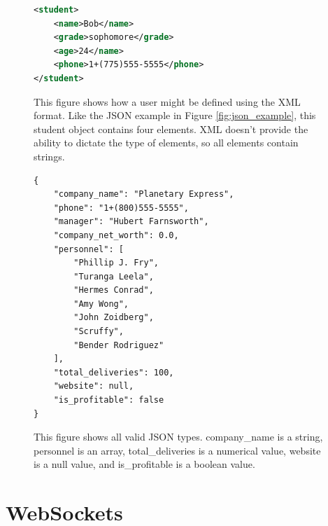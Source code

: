\begin{figure}
\begin{center}
\begin{lstlisting}[language=XML]
<student>
    <name>Bob</name>
    <grade>sophomore</grade>
    <age>24</name>
    <phone>1+(775)555-5555</phone>
</student>
\end{lstlisting}
\caption[XML Example]{This figure shows how a user might be defined using the XML format. Like the JSON example in Figure \ref{fig:json_example}, this student object contains four elements. XML doesn't provide the ability to dictate the type of elements, so all elements contain strings.\label{fig:xml_example}}
\end{center}
\end{figure}

\begin{figure}
\begin{center}
\begin{lstlisting}
{
    "company_name": "Planetary Express",
    "phone": "1+(800)555-5555",
    "manager": "Hubert Farnsworth",
    "company_net_worth": 0.0,
    "personnel": [
        "Phillip J. Fry",
        "Turanga Leela",
        "Hermes Conrad",
        "Amy Wong",
        "John Zoidberg",
        "Scruffy",
        "Bender Rodriguez"
    ],
    "total_deliveries": 100,
    "website": null,
    "is_profitable": false
}
\end{lstlisting}
\caption[JSON All Types]{This figure shows all valid JSON types. company\_name is a string, personnel is an array, total\_deliveries is a numerical value, website is a null value, and is\_profitable is a boolean value.\label{fig:json_all_types}}
\end{center}
\end{figure}

\section{WebSockets}

